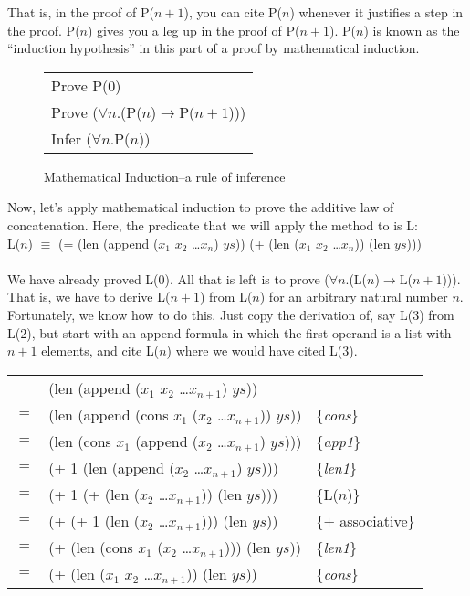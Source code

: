 That is, in the proof of P($n+1$), you can cite P($n$) whenever it justifies a step in the proof. P($n$) gives you a leg up in the proof of P($n+1$). P($n$) is known as the ``induction hypothesis'' in this part of a proof by mathematical induction.

\begin{figure}
\begin{center}
\begin{tabular}{l}
Prove P(0) \\
Prove ($\forall$$n$.(P($n$)$\rightarrow$P($n+1$))) \\
\hline
Infer ($\forall$$n$.P($n$))
\end{tabular}
\end{center}
\caption{Mathematical Induction--a rule of inference}
\label{fig-04-01}
\end{figure}

Now, let's apply mathematical induction to prove the additive law of concatenation. Here, the predicate that we will apply the method to is L: \\
L($n$) $\equiv$ (= (len (append ($x_1$ $x_2$ \dots $x_n$) $ys$))
                   (+ (len ($x_1$ $x_2$ \dots $x_n$)) (len $ys$)))
\\
\\

We have already proved L(0). All that is left is to prove ($\forall$$n$.(L($n$)$\rightarrow$L($n+1$))). That is, we have to derive L($n+1$) from L($n$) for an arbitrary natural number $n$. Fortunately, we know how to do this. Just copy the derivation of, say L(3) from L(2), but start with an append formula in which the first operand is a list with $n+1$ elements, and cite L($n$) where we would have cited L(3).

\begin{center}
\begin{tabular}{lll}
    & (len (append ($x_1$ $x_2$ \dots $x_{n+1}$) $ys$))         &                     \\
$=$ & (len (append (cons $x_1$ ($x_2$ \dots $x_{n+1}$)) $ys$))  & \{\emph{cons}\}     \\
$=$ & (len (cons $x_1$ (append ($x_2$ \dots $x_{n+1}$) $ys$)))  & \{\emph{app1}\}     \\
$=$ & (+ 1 (len (append ($x_2$ \dots $x_{n+1}$) $ys$)))         & \{\emph{len1}\}     \\
$=$ & (+ 1 (+ (len ($x_2$ \dots $x_{n+1}$)) (len $ys$)))        & \{L($n$)\}          \\
$=$ & (+ (+ 1 (len ($x_2$ \dots $x_{n+1}$))) (len $ys$))        & \{$+$ associative\} \\
$=$ & (+ (len (cons $x_1$ ($x_2$ \dots $x_{n+1}$))) (len $ys$)) & \{\emph{len1}\}     \\
$=$ & (+ (len ($x_1$ $x_2$ \dots $x_{n+1}$)) (len $ys$))        & \{\emph{cons}\}     \\
\end{tabular}
\end{center}

